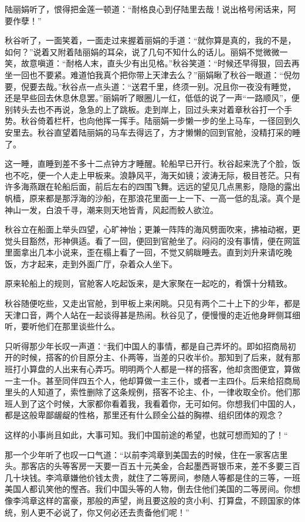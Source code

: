 \documentclass[12pt,UTF8]{ctexbook}
\begin{document}
{{{陆丽娟听了，恨得把金莲一顿道：“耐格良心到仔陆里去哉！说出格号闲话来，阿要作孽！”

秋谷听了，一面笑着，一面走过来握着丽娟的手道：“就你算是真的，我的不是，如何？”说着又附着陆丽娟的耳朵，说了几句不知什么的话儿。丽娟不觉微微一笑，故意嗔道：“耐格人末，直头少有出见格。”秋谷笑道：“时候还早得狠，回去再坐一回也不要紧。难道怕我真个把你带上天津去么？”丽娟瞅了秋谷一眼道：“倪勿要，倪要去哉。”秋谷点一点头道：“送君千里，终须一别。况且你一夜没有睡觉，还是早些回去休息休息罢。”丽娟听了眼圈儿一红，低低的说了一声“一路顺风”，便别转头去也不再说，急急的上了跳板。走到岸上，回过头来对着章秋谷打一个手势。秋谷倚着栏杆，也向他挥一挥手。陆丽娟一步懒一步的坐上马车，一径回到久安里去。秋谷直望着陆丽娟的马车去得远了，方才懒懒的回到官舱，没精打采的睡了。

这一睡，直睡到差不多十二点钟方才睡醒。轮船早已开行。秋谷起来洗了个脸，饭也不吃，便一个人走上甲板来。浪静风平，海天如镜；波涛无际，极目苍茫。只有许多海燕跟在轮船后面，前后左右的四围飞舞。远远的望见几点黑影，隐隐的露出帆樯，原来都是那浮海的沙船，在那浪花里面一上一下、一高一低的乱滚。真个是神山一发，白浪千寻，潮来则天地皆青，风起而鲛人欲泣。

秋谷立在船面上举头四望，心旷神怡；更兼一阵阵的海风劈面吹来，拂袖动裾，更觉头目豁然，形神俱适。看了一回，便回到官舱坐了。闷闷的没有事情，便在网篮里面拿出几本小说来，歪在榻上看了一回，不觉又鹓眬睡去。直到刘升来请吃晚饭，方才起来，走到外面广厅，杂着众人坐下。

原来轮船上的规则，官舱客人吃起饭来，是大家聚在一起吃的，肴馔十分精致。

秋谷随便吃些，又走出官舱，到甲板上来闲眺。只见有两个二十上下的少年，都是天津口音，两个人站在一起谈得甚是热闹。秋谷见了，便慢慢的走近他身畔侧耳细听，要听他们在那里谈些什么。

只听得那少年长叹一声道：“我们中国人的事情，都是自己弄坏的。即如招商局初开的时候，搭客的价目原分主、仆两等，当差的只收半价。那知到了后来，就有那班打小算盘的人出来有心弄巧。明明两个人都是一样的搭客，他却贪图便宜，算做一主一仆。甚至同伴四五个人，他却算做一主三仆，或者一主四仆。后来给招商局里头的人知道了，索性删除了这条规例，搭客不论主、仆，一律收取全价。他们那班人到了这个时候，大家都你看着我，我看着你，无可如何。你想我们中国的人，都是这般卑鄙龌龊的性格，那里还有什么顾全公益的胸襟、组织团体的观念？

这样的小事尚且如此，大事可知。我们中国前途的希望，也就可想而知的了！“

那一个少年听了也叹一口气道：“以前李鸿章到美国去的时候，住在一家客店里头。那客店的头等客房一天要一百五十元美金，合起墨西哥银币来，差不多要三百几十块钱。李鸿章嫌他价钱太贵，就住了二等房间，参随人等都是住的三等，一班美国人都讥笑他的慳吝。我们中国头等的人物，倒去住他们美国的二等房间。你想像李鸿章这样的富豪，那般的声望，尚且要这般的贪小利、打算盘，不顾国家的体统，别人更不必说了，你又何必还去责备他们呢！”

}}}
\end{document}

